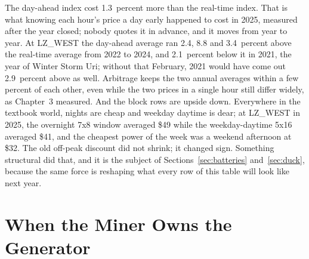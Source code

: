 The day-ahead index cost 1.3~percent more than the real-time index. That is what knowing each hour's price a day early happened to cost in 2025, measured after the year closed; nobody quotes it in advance, and it moves from year to year. At LZ\_WEST the day-ahead average ran 2.4, 8.8 and 3.4~percent above the real-time average from 2022 to 2024, and 2.1~percent below it in 2021, the year of Winter Storm Uri; without that February, 2021 would have come out 2.9~percent above as well. Arbitrage keeps the two annual averages within a few percent of each other, even while the two prices in a single hour still differ widely, as Chapter~3 measured. %
And the block rows are upside down. Everywhere in the textbook world, nights are cheap and weekday daytime is dear; at LZ\_WEST in 2025, the overnight 7x8 window averaged \$49 while the weekday-daytime 5x16 averaged \$41, and the cheapest power of the week was a weekend afternoon at \$32. %
The old off-peak discount did not shrink; it changed sign. Something structural did that, and it is the subject of Sections~\ref{sec:batteries} and~\ref{sec:duck}, because the same force is reshaping what every row of this table will look like next year.

\section{When the Miner Owns the Generator}
\label{sec:ownergen}

